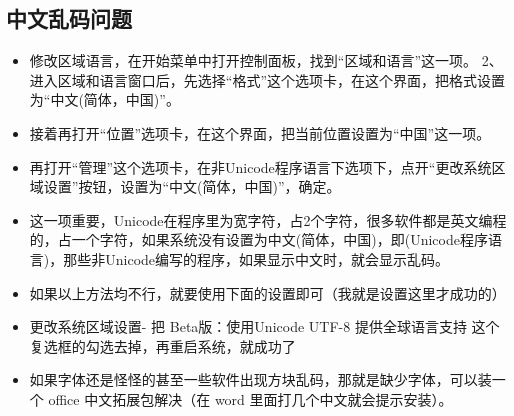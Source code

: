 \subsection{中文乱码问题}
\begin{itemize}
\item 修改区域语言，在开始菜单中打开控制面板，找到“区域和语言”这一项。
2、进入区域和语言窗口后，先选择“格式”这个选项卡，在这个界面，把格式设置为“中文(简体，中国)”。
\item 接着再打开“位置”选项卡，在这个界面，把当前位置设置为“中国”这一项。
\item 再打开“管理”这个选项卡，在非Unicode程序语言下选项下，点开“更改系统区域设置”按钮，设置为“中文(简体，中国)”，确定。
\item 这一项重要，Unicode在程序里为宽字符，占2个字符，很多软件都是英文编程的，占一个字符，如果系统没有设置为中文(简体，中国)，即(Unicode程序语言)，那些非Unicode编写的程序，如果显示中文时，就会显示乱码。
\item 如果以上方法均不行，就要使用下面的设置即可（我就是设置这里才成功的）
\item 更改系统区域设置- 把 Beta版：使用Unicode UTF-8 提供全球语言支持 这个复选框的勾选去掉，再重启系统，就成功了
\item 如果字体还是怪怪的甚至一些软件出现方块乱码，那就是缺少字体，可以装一个 office 中文拓展包解决（在 word 里面打几个中文就会提示安装）。
\end{itemize}
